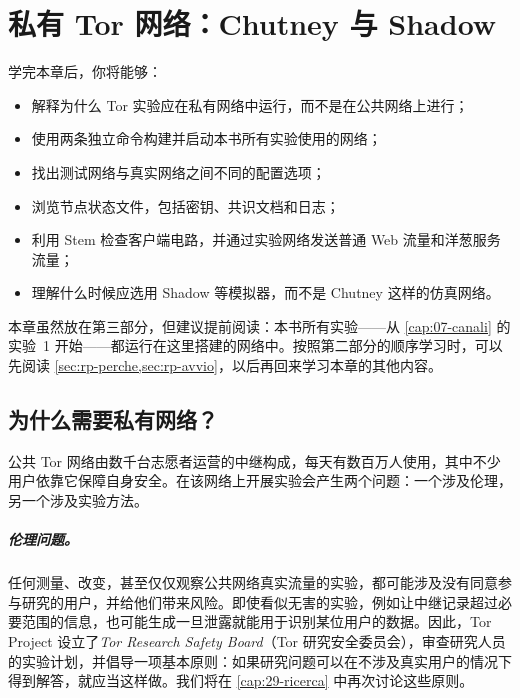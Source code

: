 \chapter{私有 Tor 网络：Chutney 与 Shadow}\label{cap:19-rete-privata}

\begin{obiettivi}
学完本章后，你将能够：
\begin{itemize}[nosep]
  \item 解释为什么 Tor 实验应在私有网络中运行，而不是在公共网络上进行；
  \item 使用两条独立命令构建并启动本书所有实验使用的网络；
  \item 找出测试网络与真实网络之间不同的配置选项；
  \item 浏览节点状态文件，包括密钥、共识文档和日志；
  \item 利用 Stem 检查客户端电路，并通过实验网络发送普通 Web 流量和洋葱服务流量；
  \item 理解什么时候应选用 Shadow 等模拟器，而不是 Chutney 这样的仿真网络。
\end{itemize}
\end{obiettivi}

本章虽然放在第三部分，但建议提前阅读：本书所有实验——从 \cref{cap:07-canali} 的实验~1 开始——都运行在这里搭建的网络中。按照第二部分的顺序学习时，可以先阅读 \cref{sec:rp-perche,sec:rp-avvio}，以后再回来学习本章的其他内容。

\section{为什么需要私有网络？}\label{sec:rp-perche}

公共 Tor 网络由数千台志愿者运营的中继构成，每天有数百万人使用，其中不少用户依靠它保障自身安全。在该网络上开展实验会产生两个问题：一个涉及伦理，另一个涉及实验方法。

\paragraph{伦理问题。}任何测量、改变，甚至仅仅观察公共网络真实流量的实验，都可能涉及没有同意参与研究的用户，并给他们带来风险。即使看似无害的实验，例如让中继记录超过必要范围的信息，也可能生成一旦泄露就能用于识别某位用户的数据。因此，Tor Project 设立了\emph{Tor Research Safety Board}（Tor 研究安全委员会），审查研究人员的实验计划，并倡导一项基本原则：如果研究问题可以在不涉及真实用户的情况下得到解答，就应当这样做。我们将在 \cref{cap:29-ricerca} 中再次讨论这些原则。

